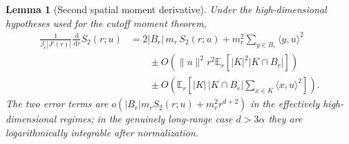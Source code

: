 \documentclass[11pt,reqno]{book}
\numberwithin{equation}{chapter}
\theoremstyle{plain}
\newtheorem{lemma}[theorem]{Lemma}
\theoremstyle{definition}
\theoremstyle{remark}
\newcommand{\1}{\mathbf 1}
\newcommand{\dd}{\,\mathrm d}
\begin{document}
\begin{lemma}[Second spatial moment derivative]
Under the high-dimensional hypotheses used for the cutoff moment theorem,
\[
\begin{aligned}
 \frac{1}{\beta_c |J'(r)|}\frac{\dd}{\dd r}S_2(r;u)
 &=
 2|B_r|\,m_r\,S_2(r;u)
 +m_r^2\sum_{y\in B_r}\langle y,u\rangle^2  \\
 &\qquad
 \pm O\!\left(
   \|u\|^2 r^2
   \mathbb E_r[|K|^2|K\cap B_r|]
 \right) \\
 &\qquad
 \pm O\!\left(
   \mathbb E_r\!\left[
     |K|\,|K\cap B_r|
     \sum_{x\in K}\langle x,u\rangle^2
   \right]
 \right).
\end{aligned}
\]
The two error terms are \(o(|B_r|m_rS_2(r;u)+m_r^2r^{d+2})\) in the
effectively high-dimensional regimes; in the genuinely long-range case
\(d>3\alpha\) they are logarithmically integrable after normalization.
\end{lemma}
\end{document}
